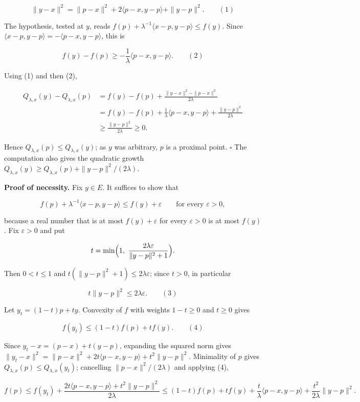 \documentclass[11pt,a4paper]{article}
\begin{document}
\[\|y-x\|^2=\|p-x\|^2+2\langle p-x,y-p\rangle+\|y-p\|^2.\qquad(1)\]


The hypothesis, tested at \(y\), reads \(f(p)+\lambda^{-1}\langle x-p,y-p\rangle\le f(y)\). Since \(\langle x-p,y-p\rangle=-\langle p-x,y-p\rangle\), this is


\[f(y)-f(p)\ge-\frac1\lambda\langle p-x,y-p\rangle.\qquad(2)\]


Using (1) and then (2),


\[\begin{aligned}
Q_{\lambda,x}(y)-Q_{\lambda,x}(p)&=f(y)-f(p)+\frac{\|y-x\|^2-\|p-x\|^2}{2\lambda}\\
&=f(y)-f(p)+\frac1\lambda\langle p-x,y-p\rangle+\frac{\|y-p\|^2}{2\lambda}\\
&\ge\frac{\|y-p\|^2}{2\lambda}\ge0 .
\end{aligned}\]


Hence \(Q_{\lambda,x}(p)\le Q_{\lambda,x}(y)\); as \(y\) was arbitrary, \(p\) is a proximal point. \(\square\) The computation also gives the quadratic growth \(Q_{\lambda,x}(y)\ge Q_{\lambda,x}(p)+\|y-p\|^2/(2\lambda)\).




\textbf{Proof of necessity.} Fix \(y\in E\). It suffices to show that


\[f(p)+\lambda^{-1}\langle x-p,y-p\rangle\le f(y)+\varepsilon\qquad\text{for every }\varepsilon>0,\]


because a real number that is at most \(f(y)+\varepsilon\) for every \(\varepsilon>0\) is at most \(f(y)\). Fix \(\varepsilon>0\) and put


\[t=\min\Bigl(1,\ \frac{2\lambda\varepsilon}{\|y-p\|^2+1}\Bigr).\]


Then \(0<t\le1\) and \(t(\|y-p\|^2+1)\le2\lambda\varepsilon\); since \(t>0\), in particular


\[t\|y-p\|^2\le2\lambda\varepsilon.\qquad(3)\]


Let \(y_t=(1-t)p+ty\). Convexity of \(f\) with weights \(1-t\ge0\) and \(t\ge0\) gives


\[f(y_t)\le(1-t)f(p)+tf(y).\qquad(4)\]


Since \(y_t-x=(p-x)+t(y-p)\), expanding the squared norm gives \(\|y_t-x\|^2=\|p-x\|^2+2t\langle p-x,y-p\rangle+t^2\|y-p\|^2\). Minimality of \(p\) gives \(Q_{\lambda,x}(p)\le Q_{\lambda,x}(y_t)\); cancelling \(\|p-x\|^2/(2\lambda)\) and applying (4),


\[f(p)\le f(y_t)+\frac{2t\langle p-x,y-p\rangle+t^2\|y-p\|^2}{2\lambda}\le(1-t)f(p)+tf(y)+\frac{t}{\lambda}\langle p-x,y-p\rangle+\frac{t^2}{2\lambda}\|y-p\|^2.\]
\end{document}
